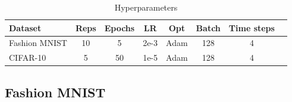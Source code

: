     \begin{table}[H]
        \begin{tabularx}{\textwidth}{|X|c|c|c|c|c|c|c|}
            \toprule
            Dataset & Reps & Epochs & LR & Opt & Batch & Time steps \\
            \midrule
            Fashion MNIST & 10 & 5 & 2e-3 & Adam & 128 & 4 \\
            CIFAR-10 & 5 & 50 & 1e-5 & Adam & 128 & 4 \\
            \bottomrule
        \end{tabularx}
        \caption{Hyperparameters}
        \label{tab:hyperparameters_energy_tradeoff}
    \end{table}

    \subsection{Fashion MNIST}
    \label{appendix:energy_tradeoff_fashion_mnist}

